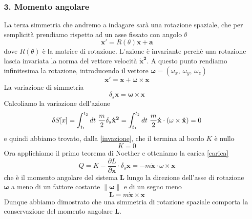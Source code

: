 \begin{example}
\subsubsection{3. Momento angolare}
    La terza simmetria che andremo a indagare sarà una rotazione spaziale, che per semplicità prendiamo rispetto ad un asse fissato con angolo $\theta$
\begin{equation}
    \mathbf x' = R(\theta) \mathbf x + \mathbf a
\end{equation}
    dove $R(\theta)$ è la matrice di rotazione. L'azione è invariante perchè una rotazione lascia invariata la norma del vettore velocità $\mathbf{\dot x^2}$. A questo punto rendiamo infinitesima la rotazione, introducendo il vettore $\mathbf \omega = (\omega_x,~\omega_y,~\omega_z)$
\begin{equation}
    \mathbf x' = \mathbf x + \mathbf \omega \times \mathbf x
\end{equation}
    La variazione di simmetria 
\begin{equation*}
    \delta_s \mathbf x = \mathbf \omega \times \mathbf x
\end{equation*}
    Calcoliamo la variazione dell'azione
\begin{equation}
    \delta S[x] = \int_{t_1}^{t_2}dt~ \frac{m}{2} \delta_s \mathbf{\dot x^2} = \int_{t_1}^{t_2}dt~ \frac{m}{2} \mathbf{\dot x} \cdot (\omega \times \mathbf{\dot x} ) = 0
\end{equation}
    e quindi abbiamo trovato, dalla \eqref{invazione}, che il termina al bordo $K$ è nullo
\begin{equation*}
    K = 0
\end{equation*}
    Ora applichiamo il primo teorema di Noether e otteniamo la carica \eqref{carica} 
\begin{equation}
    Q = K - \frac{\partial L}{\partial \mathbf{\dot x}} \cdot \delta_s \mathbf x = - m \mathbf{\dot x} \cdot \omega \times \mathbf x 
\end{equation}
    che è il momento angolare del sistema $\mathbf L$ lungo la direzione dell'asse di rotazione $\mathbf \omega$ a meno di un fattore costante $\|\mathbf \omega\|$ e di un segno meno
\begin{equation*}
    \mathbf L = m \mathbf{\dot x} \times \mathbf x 
\end{equation*}
    Dunque abbiamo dimostrato che una simmetria di rotazione spaziale comporta la conservazione del momento angolare $\mathbf L$.
\end{example}

